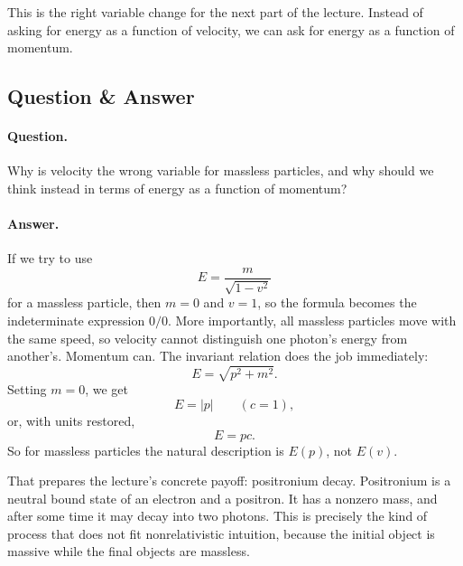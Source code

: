 This is the right variable change for the next part of the lecture. Instead of asking for energy as a function of velocity, we can ask for energy as a function of momentum.

\subsection{Question \& Answer}

\paragraph{Question.}
Why is velocity the wrong variable for massless particles, and why should we think instead in terms of energy as a function of momentum?

\paragraph{Answer.}
If we try to use
\begin{equation}
E=\frac{m}{\sqrt{1-v^2}}
\end{equation}
for a massless particle, then \(m=0\) and \(v=1\), so the formula becomes the indeterminate expression \(0/0\). More importantly, all massless particles move with the same speed, so velocity cannot distinguish one photon's energy from another's. Momentum can. The invariant relation does the job immediately:
\begin{equation}
E=\sqrt{p^2+m^2}.
\end{equation}
Setting \(m=0\), we get
\begin{equation}
E=|p|
\qquad (c=1),
\end{equation}
or, with units restored,
\begin{equation}
E=pc.
\end{equation}
So for massless particles the natural description is \(E(p)\), not \(E(v)\).

That prepares the lecture's concrete payoff: positronium decay. Positronium is a neutral bound state of an electron and a positron. It has a nonzero mass, and after some time it may decay into two photons. This is precisely the kind of process that does not fit nonrelativistic intuition, because the initial object is massive while the final objects are massless.

